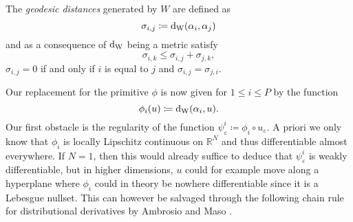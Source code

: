 The \emph{geodesic distances} generated by $ W $  are defined as
\begin{equation*}
	\sigma_{ i , j } 
	\coloneqq
	\geodesic_distance ( \alpha_{ i } , \alpha_{ j } )
\end{equation*}
and as a consequence of $ \geodesic_distance $ being a metric satisfy
\begin{equation*}
	\sigma_{ i , k } \leq \sigma_{ i , j } + \sigma_{ j , k },
\end{equation*}
$ \sigma_{ i , j } = 0 $ if and only if $ i $ is equal to $ j $ and $ \sigma_{ i , j } = \sigma_{ j, i } $.

Our replacement for the primitive $ \phi $ is now given for $ 1 \leq i \leq P $ by the function
\begin{equation*}
	\phi_{ i } ( u ) 
	\coloneqq
	\geodesic_distance ( \alpha_{ i } , u ).
\end{equation*}
Our first obstacle is the regularity of the function $ \psi_{ \varepsilon }^{ i } \coloneqq \phi_{ i } \circ u_{ \varepsilon } $. A priori we only know that $ \phi_{ i } $ is locally Lipschitz continuous on $ \mathbb{ R }^{ N } $ and thus differentiable almost everywhere. If $ N = 1 $, then this would already suffice to deduce that $ \psi_{ \varepsilon  }^{ i } $ is weakly differentiable, but in higher dimensions, $ u $ could for example move along a hyperplane where $ \phi_{ i } $ could in theory be nowhere differentiable since it is a Lebesgue nullset. This can however be salvaged through the following chain rule for distributional derivatives by Ambrosio and Maso \cite[Cor.~3.2]{ambrosio_maso_chain_rule}.

